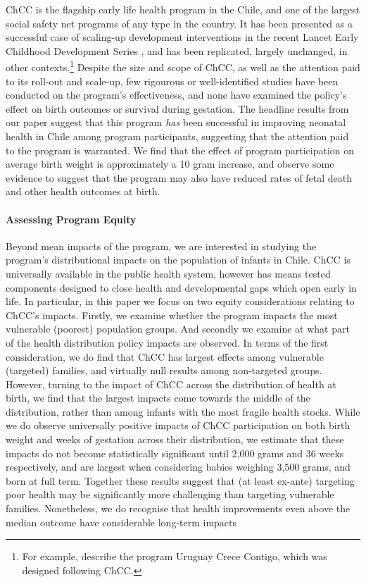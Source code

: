 \documentclass[12pt]{article}
\begin{document}
\begin{spacing}{1.4}
ChCC is the flagship early life health program in the Chile, and one of
the largest social safety net programs of any type in the country.  It has
been presented as a successful case of scaling-up development interventions
in the recent Lancet Early Childhood Development Series 
\citep{Richteretal2017}, and has been replicated, largely unchanged, in
other contexts.\footnote{For example, \citet{Marroigetal2017} describe the
  program Uruguay Crece Contigo, which was designed following ChCC.} Despite
the size and scope of ChCC, as well as the attention paid to its roll-out and
scale-up, few rigourous or well-identified studies have been
conducted on the program's effectiveness, and none %
have examined the policy's effect on birth outcomes or survival during
gestation. The headline results from our paper suggest that this program
\emph{has} been successful in improving neonatal health in Chile among program
participants, suggesting that the attention paid to the program is warranted.
We find that the effect of program participation on average birth weight is
approximately a
10 gram increase, and observe some evidence to suggest that the program
may also have reduced rates of fetal death and other health outcomes at
birth.

\paragraph{Assessing Program Equity}
Beyond mean impacts of the program, we are interested in studying the
program's distributional impacts on the population of infants in Chile.
ChCC is universally available in the public health system, however has
means tested components designed to close health and developmental gaps
which open early in life. In particular, in this paper we focus on two
equity considerations relating to ChCC's impacts.  Firstly, we examine
whether the program impacts the most vulnerable (poorest) population groups.
And secondly we examine at what part of the health distribution policy
impacts are observed. In terms of the first consideration, we do find
that ChCC has largest effects among vulnerable (targeted) families, and
virtually null results among non-targeted groups.
However, turning to the impact of ChCC across the distribution of health
at birth, we find that the largest impacts come towards the middle of the
distribution, rather than among infants with the most fragile health
stocks.  While we do observe universally positive impacts of ChCC
participation on both birth weight and weeks of gestation across their
distribution, we estimate that these impacts do not become statistically
significant until 2,000 grams and 36 weeks respectively, and are largest
when considering babies weighing 3,500 grams, and born at full term.
Together these results suggest that (at least ex-ante) targeting poor
health may be significantly more challenging than targeting vulnerable
families.  Nonetheless, we do recognise that health improvements even
above the median outcome have considerable long-term impacts \citep{Royer2009}


\end{spacing}
\end{document}
